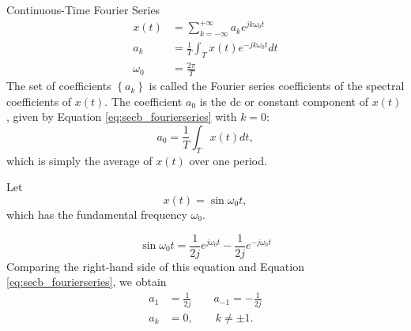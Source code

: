 \begin{frame}{Continuous-Time Fourier Series}
    {
        \begin{equation}\label{eq:secb_fourierseries}
            \begin{aligned}
                x(t) &= \sum_{k=-\infty}^{+\infty}a_k e^{jk\omega_0 t}\\
                a_k &= \frac{1}{T} \int_{T}x(t)e^{-jk\omega_0 t}dt\\
                \omega_0 &= \frac{2\pi}{T}
            \end{aligned}
        \end{equation}
        The set of coefficients $\left\{a_k\right\}$ is called the \alert{Fourier series coefficients} of the \alert{spectral coefficients} of $x(t)$.
        The coefficient $a_0$ is the dc or constant component of $x(t)$, given by Equation \ref{eq:secb_fourierseries} with $k=0$:
        \begin{equation}\label{eq:secb_a0}
            a_0 = \frac{1}{T} \int_{T}x(t)dt,
        \end{equation}
        which is simply the average of $x(t)$ over one period.
    }
\end{frame}

\begin{frame}[plain]
    \begin{example}
        Let
        \begin{equation*}
            x(t) = \sin \omega_0t,
        \end{equation*}
        which has the fundamental frequency $\omega_0$.
    \end{example}

    {
        \begin{equation*}
            \sin \omega_0t = \frac{1}{2j}e^{j\omega_0 t}- \frac{1}{2j}e^{-j\omega_0 t}
        \end{equation*}
        Comparing the right-hand side of this equation and Equation \ref{eq:secb_fourierseries}, we obtain
        \begin{equation*}
            \begin{split}
            a_1 &=  \frac{1}{2j} \qquad a_{-1} = -\frac{1}{2j}\\
            a_k &=0, \qquad k \neq \pm 1.\\
            \end{split}
        \end{equation*}
    }
\end{frame}

